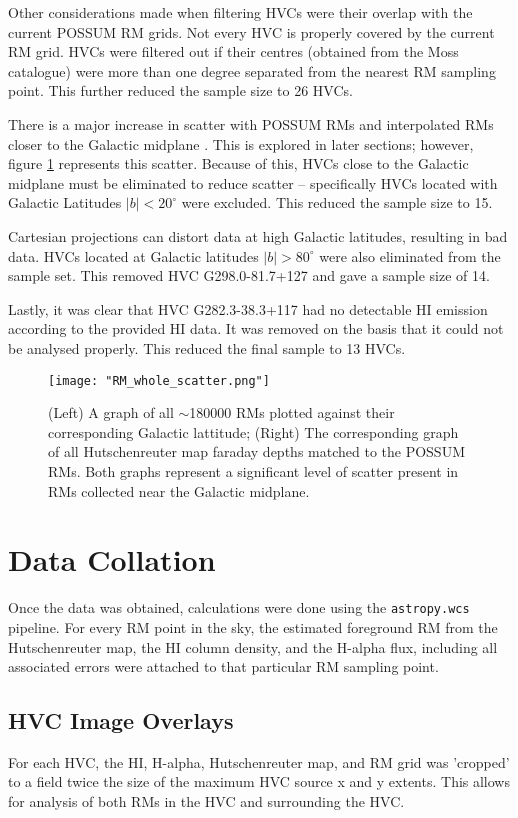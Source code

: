 Other considerations made when filtering HVCs were their overlap with the current POSSUM RM grids. Not every HVC is properly covered by the current RM grid. HVCs were filtered out if their centres (obtained from the Moss catalogue) were more than one degree separated from the nearest RM sampling point. This further reduced the sample size to 26 HVCs.


There is a major increase in scatter with POSSUM RMs and interpolated RMs closer to the Galactic midplane \citep{ID21}. This is explored in later sections; however, figure \ref{fig:rm_scatter} represents this scatter. Because of this, HVCs close to the Galactic midplane must be eliminated to reduce scatter – specifically HVCs located with Galactic Latitudes $|b|<20^{\circ}$ were excluded. This reduced the sample size to 15.


Cartesian projections can distort data at high Galactic latitudes, resulting in bad data. HVCs located at Galactic latitudes $|b|>80^{\circ}$ were also eliminated from the sample set. This removed HVC G298.0-81.7+127 and gave a sample size of 14.


Lastly, it was clear that HVC G282.3-38.3+117 had no detectable HI emission according to the provided HI data. It was removed on the basis that it could not be analysed properly. This reduced the final sample to 13 HVCs.

\begin{figure}
    \texttt{[image: "RM\_whole\_scatter.png"]}
    \centering
    \caption{(Left) A graph of all $\sim$180000 RMs plotted against their corresponding Galactic lattitude; (Right) The corresponding graph of all Hutschenreuter map faraday depths matched to the POSSUM RMs. Both graphs represent a significant level of scatter present in RMs collected near the Galactic midplane.}
    \label{fig:rm_scatter}
\end{figure}

\section{Data Collation}
\label{sec:collation}

Once the data was obtained, calculations were done using the \verb|astropy.wcs| pipeline. For every RM point in the sky, the estimated foreground RM from the Hutschenreuter map, the HI column density, and the H-alpha flux, including all associated errors were attached to that particular RM sampling point.

\subsection{HVC Image Overlays}
\label{ssec:hvc_snapshot}

For each HVC, the HI, H-alpha, Hutschenreuter map, and RM grid was 'cropped' to a field twice the size of the maximum HVC source x and y extents. This allows for analysis of both RMs in the HVC and surrounding the HVC.


